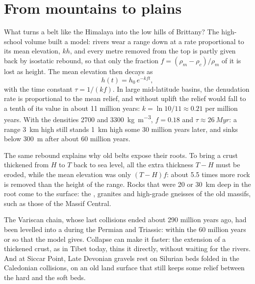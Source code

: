 \section{From mountains to plains}\label{sec:b2:wilson-cycle:erosion}

What turns a belt like the Himalaya into the low hills of Brittany? The high-school volume
built a model: rivers wear a range down at a rate proportional to its mean elevation, $kh$,
and every metre removed from the top is partly given back by isostatic rebound, so that only
the fraction $f = (\rho_m - \rho_c)/\rho_m$ of it is lost as height. The mean elevation then
decays as
\[
  h(t) = h_0\,e^{-k f t} ,
\]
with the time constant $\tau = 1/(kf)$. In large mid-latitude basins, the denudation rate is
proportional to the mean relief, and without uplift the relief would fall to a tenth of its
value in about 11 million years: $k = \ln 10/11 \approx 0.21$ per million years. With the
densities 2700 and \qty{3300}{kg.m^{-3}}, $f = 0.18$ and $\tau \approx \qty{26}{Myr}$: a
range \qty{3}{km} high still stands \qty{1}{km} high some 30 million years later, and sinks
below \qty{300}{m} after about 60 million years.

The same rebound explains why old belts expose their roots. To bring a crust thickened from
$H$ to $T$ back to sea level, all the extra thickness $T - H$ must be eroded, while the mean
elevation was only $(T - H)f$: about 5.5 times more rock is removed than the height of the
range. Rocks that were 20 or \qty{30}{km} deep in the root come to the surface: the
, granites and high-grade gneisses of the old massifs, such as those of the Massif
Central.

The Variscan chain, whose last collisions ended about 290 million years ago, had been
levelled into a  during the Permian and Triassic: within the 60 million years or so
that the model gives. Collapse can make it faster: the extension of a thickened crust, as in
Tibet today, thins it directly, without waiting for the rivers. And at Siccar Point, Late Devonian gravels rest on
Silurian beds folded in the Caledonian collisions, on an old land surface that still keeps
some relief between the hard and the soft beds.

